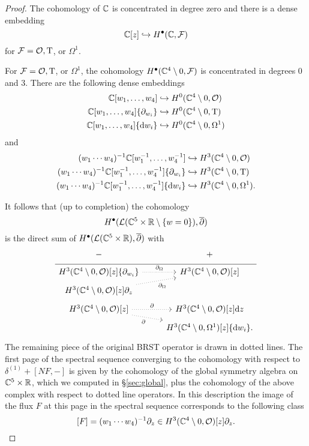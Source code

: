 \begin{proof}
The cohomology of $\mathbb C$ is concentrated in degree zero and there is a dense embedding
\[
\mathbb C[z] \hookrightarrow H^\bullet(\mathbb C, \mathcal F) 
\]
for $\mathcal F = \mathcal O, {\rm T}$, or $\Omega^1$. 

For $\mathcal F = \mathcal O, {\rm T}$, or $\Omega^1$, the cohomology $H^\bullet(\mathbb C^4 \setminus 0, \mathcal F)$ is concentrated in degrees $0$ and $3$. 
There are the following dense embeddings 
\begin{align*}
\mathbb C[w_1,\ldots, w_4] & \hookrightarrow H^0(\mathbb C^4 \setminus 0, \mathcal O) \\ 
\mathbb C[w_1,\ldots, w_4] \{\partial_{w_i}\} & \hookrightarrow H^0(\mathbb C^4 \setminus 0, {\rm T}) \\
\mathbb C[w_1,\ldots, w_4] \{{\rm d} w_i\} & \hookrightarrow H^0(\mathbb C^4 \setminus 0, \Omega^1) 
\end{align*}
and
\begin{align*}
(w_1\cdots w_4)^{-1} \mathbb C[w_1^{-1},\ldots, w_4^{-1}] & \hookrightarrow H^3(\mathbb C^4 \setminus 0, \mathcal O) \\ 
(w_1\cdots w_4)^{-1} \mathbb C[w_1^{-1},\ldots, w_4^{-1}] \{\partial_{w_i}\} & \hookrightarrow H^3(\mathbb C^4 \setminus 0, {\rm T}) \\
(w_1\cdots w_4)^{-1} \mathbb C[w_1^{-1},\ldots, w_4^{-1}] \{{\rm d} w_i\} & \hookrightarrow H^3(\mathbb C^4 \setminus 0, \Omega^1) .
\end{align*}

It follows that (up to completion) the cohomology 
\[
H^\bullet(\mathcal L(\mathbb C^5 \times \mathbb R \setminus \{w=0\}) , \overline{\partial})
\]
is the direct sum of $H^\bullet(\mathcal L(\mathbb C^5 \times \mathbb R), \overline{\partial})$ with 
\begin{equation}
  \label{eqn:ads4ss2} 
  \begin{tikzcd}[row sep = 1 ex]
    - & + \\ \hline
H^3(\CC^4\setminus 0, \cO)[z] \{\partial_{w_i}\}  \ar[r, dotted, "\div"] & H^3(\CC^4 \setminus 0, \cO) [z] \\
H^3(\CC^4\setminus 0, \cO) [z] \partial_z \ar[ur, dotted, "\div"'] \\
H^3(\CC^4\setminus 0, \cO) [z] \ar[r, dotted, "\del"] \ar[dr, dotted, "\del"'] & H^3(\CC^4\setminus 0, \cO)[z] \d z \\ & H^3(\CC^4\setminus 0, \Omega^1)[z] \{\d w_i\} .
\end{tikzcd}
\end{equation}
The remaining piece of the original BRST operator is drawn in dotted lines. 
The first page of the spectral sequence converging to the cohomology with respect to $\delta^{(1)} + [N F, -]$ is given by the cohomology of the global symmetry algebra on $\mathbb C^5 \times \mathbb R$, which we computed in \S \ref{sec:global}, plus the cohomology of the above complex with respect to dotted line operators. 
In this description the image of the flux $F$ at this page in the spectral sequence corresponds to the following class 
\[
[F] = (w_1 \cdots w_4)^{-1} \partial_z \in H^3(\mathbb C^4\setminus 0, \mathcal O) [z] \partial_z .
\]


\end{proof}
